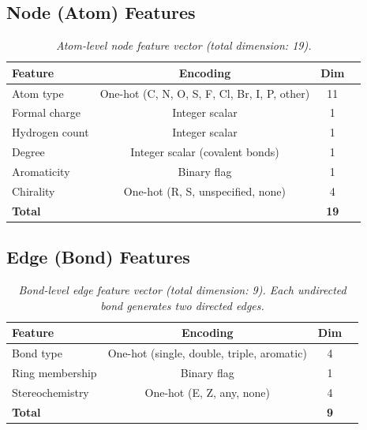 \documentclass[12pt,a4paper]{report}
\begin{document}
\subsection{Node (Atom) Features}

\begin{table}[htbp]
\centering
\caption{\textit{Atom-level node feature vector (total dimension: 19).}}
\label{tab:node_features}
\renewcommand{\arraystretch}{1.1}
\begin{tabular}{lccc}
\hline
\textbf{Feature}   & \textbf{Encoding}                          & \textbf{Dim} \\
\hline
Atom type          & One-hot (C, N, O, S, F, Cl, Br, I, P, other) & 11 \\
Formal charge      & Integer scalar                             & 1 \\
Hydrogen count     & Integer scalar                             & 1 \\
Degree             & Integer scalar (covalent bonds)            & 1 \\
Aromaticity        & Binary flag                                & 1 \\
Chirality          & One-hot (R, S, unspecified, none)          & 4 \\
\hline
\textbf{Total}     &                                            & \textbf{19} \\
\hline
\end{tabular}
\end{table}

\subsection{Edge (Bond) Features}

\begin{table}[htbp]
\centering
\caption{\textit{Bond-level edge feature vector (total dimension: 9). Each undirected bond generates two directed edges.}}
\label{tab:edge_features}
\renewcommand{\arraystretch}{1.1}
\begin{tabular}{lccc}
\hline
\textbf{Feature}   & \textbf{Encoding}                                  & \textbf{Dim} \\
\hline
Bond type          & One-hot (single, double, triple, aromatic)         & 4 \\
Ring membership    & Binary flag                                        & 1 \\
Stereochemistry    & One-hot (E, Z, any, none)                          & 4 \\
\hline
\textbf{Total}     &                                                    & \textbf{9} \\
\hline
\end{tabular}
\end{table}
\end{document}
